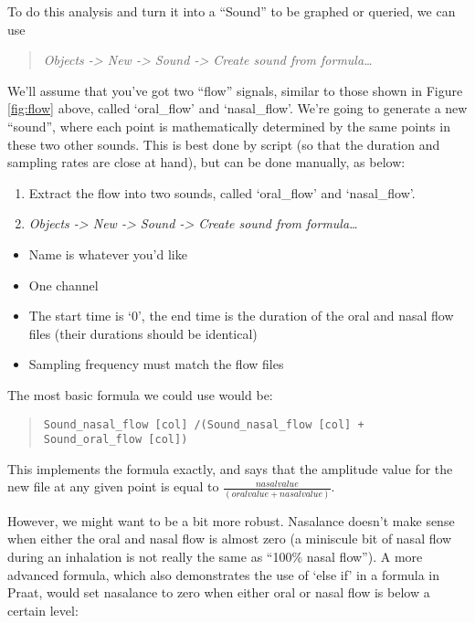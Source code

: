 To do this analysis and turn it into a ``Sound'' to be graphed or
queried, we can use

\begin{quote}
\emph{Objects -\textgreater{} New -\textgreater{} Sound -\textgreater{}
Create sound from formula\ldots{}}
\end{quote}

We'll assume that you've got two ``flow'' signals, similar to those
shown in Figure \ref{fig:flow} above, called `oral\_flow' and
`nasal\_flow'. We're going to generate a new ``sound'', where each point
is mathematically determined by the same points in these two other
sounds. This is best done by script (so that the duration and sampling
rates are close at hand), but can be done manually, as below:

\begin{enumerate}
\def\labelenumi{\arabic{enumi}.}
\tightlist
\item
  Extract the flow into two sounds, called `oral\_flow' and
  `nasal\_flow'.
\item
  \emph{Objects -\textgreater{} New -\textgreater{} Sound
  -\textgreater{} Create sound from formula\ldots{}}
\end{enumerate}

\begin{itemize}
\tightlist
\item
  Name is whatever you'd like
\item
  One channel
\item
  The start time is `0', the end time is the duration of the oral and
  nasal flow files (their durations should be identical)
\item
  Sampling frequency must match the flow files
\end{itemize}

The most basic formula we could use would be:

\begin{quote}
\texttt{Sound\_nasal\_flow [col] /(Sound\_nasal\_flow [col] + Sound\_oral\_flow [col])}
\end{quote}

This implements the formula exactly, and says that the amplitude value
for the new file at any given point is equal to
\(\frac{nasal value}{(oral value + nasal value)}\).

However, we might want to be a bit more robust. Nasalance doesn't make
sense when either the oral and nasal flow is almost zero (a miniscule
bit of nasal flow during an inhalation is not really the same as ``100\%
nasal flow''). A more advanced formula, which also demonstrates the use
of `else if' in a formula in Praat, would set nasalance to zero when
either oral or nasal flow is below a certain level:


